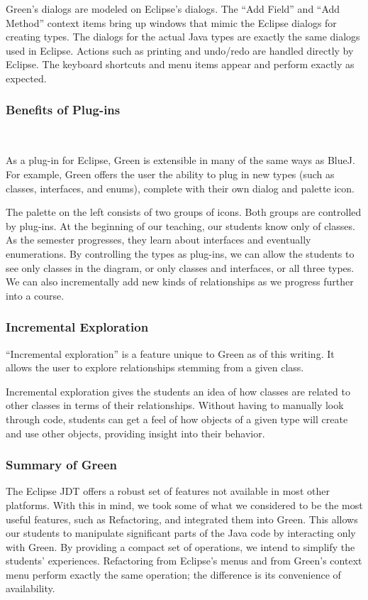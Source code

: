 \documentclass{sig-alt-release}
\begin{document}
      Green's dialogs are modeled on Eclipse's dialogs. The ``Add Field'' and
      ``Add Method'' context items bring up windows that mimic the Eclipse
      dialogs for creating types. The dialogs for the actual Java types are
      exactly the same dialogs used in Eclipse. Actions such as printing and
      undo/redo are handled directly  by Eclipse. The keyboard shortcuts and
      menu items appear and perform exactly as expected.
    
    \subsubsection{Benefits of Plug-ins}
      \figEditor\

      As a plug-in for Eclipse, Green is extensible in many of the same ways as
      BlueJ. For example, Green offers the user the ability to plug in new types
      (such as classes, interfaces, and enums), complete with their own dialog
      and palette icon. 

      The palette on the left consists of two groups of icons. Both groups are
      controlled by plug-ins. At the beginning of our teaching, our students
      know only of classes. As the semester progresses, they learn about
      interfaces and eventually enumerations. By controlling the types as
      plug-ins, we can allow the students to see only classes in the diagram, or
      only classes and interfaces, or all three types. We can also incrementally
      add new kinds of relationships as we progress further into a course.

    \subsubsection{Incremental Exploration}
      ``Incremental exploration'' is a feature unique to Green as of this
      writing. It allows the user to explore relationships stemming from a given
      class.
      
      \figExploration
      
      Incremental exploration gives the students an idea of how classes are
      related to other classes in terms of their relationships. Without having
      to manually look through code, students can get a feel of how objects of
      a given type will create and use other objects, providing insight into
      their behavior.

    \subsubsection{Summary of Green}
      The Eclipse JDT offers a robust set of features not available in most
      other platforms. With this in mind, we took some of what we considered to
      be the most useful features, such as Refactoring, and integrated them into
      Green. This allows our students to manipulate significant parts of the
      Java code by interacting only with Green. By providing a compact set of
      operations, we intend to simplify the students' experiences. Refactoring
      from Eclipse's menus and from Green's context menu perform exactly the
      same operation; the difference is its convenience of availability.
\end{document}
